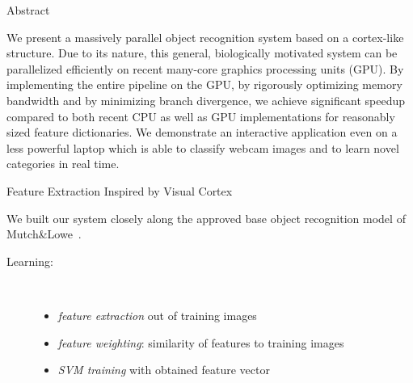 \documentclass[final]{beamer}
\title[]{}
\author[]{Helmut Sedding and Ferdinand Deger}
\institute[]{Institute of Media Informatics, University Ulm}
\date{Jul. 31th, 2007}
\begin{document}
  \begin{frame}{} 
  
    \begin{columns}[t]
        \begin{column}{.48\linewidth}
            \begin{block}{Abstract}

We present a massively parallel object recognition system based on a cortex-like structure. Due to its nature, this general, biologically motivated system can be parallelized efficiently on recent many-core graphics processing units (GPU). By implementing the entire pipeline on the GPU, by rigorously optimizing memory bandwidth and by minimizing branch divergence, we achieve significant speedup compared to both recent CPU as well as GPU implementations for reasonably sized feature dictionaries. We demonstrate an interactive application even on a less powerful laptop which is able to classify webcam images and to learn novel categories in real time.\newline
        \end{block}
        
        \begin{block} {Feature Extraction Inspired by Visual Cortex}
        
We built our system closely along the approved base object recognition model of
Mutch\&Lowe~\cite{mutch06}.

\begin{description}

\item[Learning:]~
\begin{itemize}
	\item  \emph{feature extraction} out of training images
	\item  \emph{feature weighting}: similarity of features to training images
	\item  \emph{SVM training} with obtained feature vector
\end{itemize}



\end{description}
\end{block}
\end{column}
\end{columns}
\end{frame}
\end{document}
